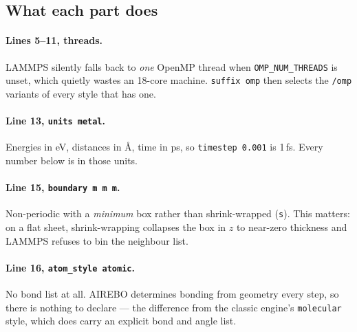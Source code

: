 \documentclass[11pt,a4paper]{article}
\begin{document}


\subsection*{What each part does}

\paragraph{Lines 5--11, threads.} LAMMPS silently falls back to \emph{one}
OpenMP thread when \texttt{OMP\_NUM\_THREADS} is unset, which quietly wastes an
18-core machine. \texttt{suffix omp} then selects the \texttt{/omp} variants of
every style that has one.

\paragraph{Line 13, \texttt{units metal}.} Energies in eV, distances in
\AA{}, time in ps, so \texttt{timestep 0.001} is 1\,fs. Every number below is in
those units.

\paragraph{Line 15, \texttt{boundary m m m}.} Non-periodic with a
\emph{minimum} box rather than shrink-wrapped (\texttt{s}). This matters: on a
flat sheet, shrink-wrapping collapses the box in $z$ to near-zero thickness and
LAMMPS refuses to bin the neighbour list.

\paragraph{Line 16, \texttt{atom\_style atomic}.} No bond list at all. AIREBO
determines bonding from geometry every step, so there is nothing to declare ---
the difference from the classic engine's \texttt{molecular} style, which does
carry an explicit bond and angle list.
\end{document}
